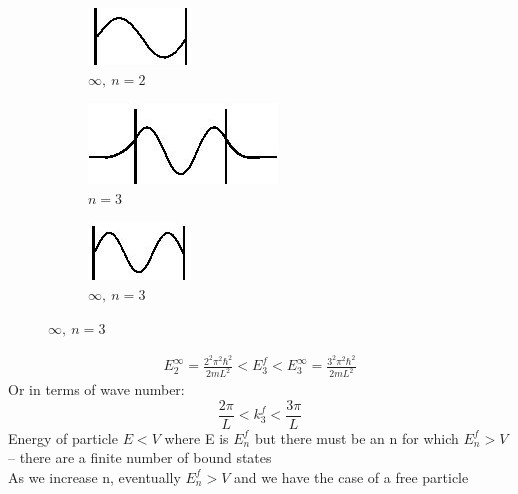 \documentclass[a4paper, 11pt, fleqn, normalem]{report}
\begin{document}
\begin{figure}[H]
    \begin{subfigure}{0.18\textwidth}
        \includegraphics{n=2.jpg}
        \caption{$\infty,~n = 2$}
    \end{subfigure}
    \begin{subfigure}{0.30\textwidth}
        \includegraphics{n=3.jpg}
        \caption{$n = 3$}
    \end{subfigure}
    \begin{subfigure}{0.2\textwidth}
        \includegraphics{infty3.jpg}
        \caption{$\infty,~n = 3$}
    \end{subfigure}
\end{figure}
\begin{gather*}
    E_{2}^{\infty} = \frac{2^{2}\pi^{2}\hbar^{2}}{2mL^{2}} < E_{3}^{f} < E_{3}^{\infty} = \frac{3^{2}\pi^{2}\hbar^{2}}{2mL^{2}}
\end{gather*}
Or in terms of wave number:
\begin{equation*}
    \frac{2\pi}{L} < k_{3}^{f} < \frac{3\pi}{L}
\end{equation*}
Energy of particle $E < V$ where E is $E_{n}^{f}$ but there must be an n for which $E_{n}^{f} > V$ -- there are a finite number of bound states \\
As we increase n, eventually $E_{n}^{f} > V$ and we have the case of a free particle
\end{document}
